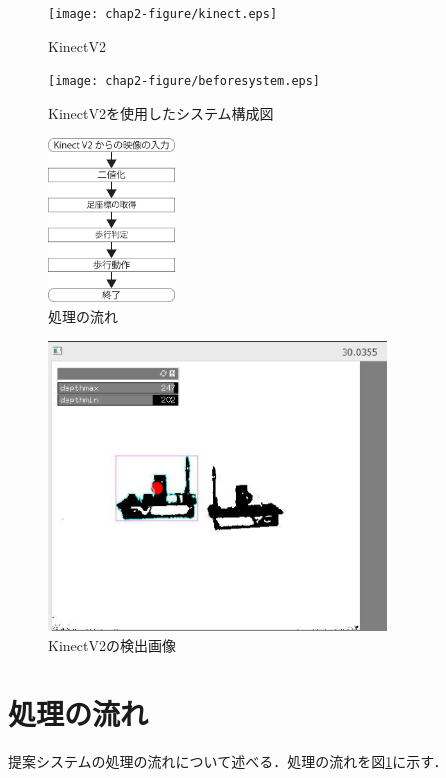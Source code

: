 \begin{figure}[tbp]
	\centering
			\texttt{[image: chap2-figure/kinect.eps]}
	\caption{KinectV2}
	\label{fig:kinect}
\end{figure}

\begin{figure}[tbp]
	\centering
			\texttt{[image: chap2-figure/beforesystem.eps]}
	\caption{KinectV2を使用したシステム構成図}
	\label{fig:beforesystemarc}
\end{figure}

\begin{figure}[tbp]
	\centering
			\includegraphics[width=0.3\textwidth]{chap2-figure/katagiri1.eps}
	\caption{処理の流れ}
	\label{fig:片桐1}
\end{figure}

\begin{figure}[tbp]
	\centering
			\includegraphics[width=0.8\textwidth]{chap2-figure/kinectsystem.eps}
	\caption{KinectV2の検出画像}
	\label{fig:kinectsystemarc}
\end{figure}
\fi

\section{処理の流れ}
提案システムの処理の流れについて述べる．処理の流れを図\ref{}に示す．


